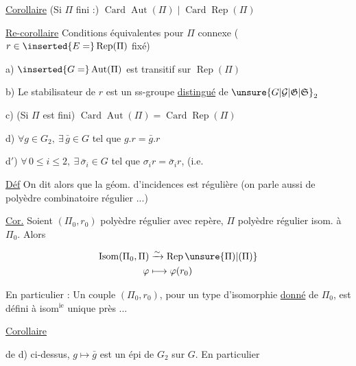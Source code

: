 
\uline{Corollaire} (Si $\Pi$ fini :) $\operatorname{Card}\operatorname{Aut}(\Pi)\mid\operatorname{Card}\operatorname{Rep}(\Pi)$

\uline{Re-corollaire} Conditions équivalentes pour $\Pi$ connexe (  $r\in\inserted{E=}\operatorname{Rep}(\Pi)$ fixé)

a) $\inserted{G=}\operatorname{Aut}(\Pi)$ est transitif sur $\operatorname{Rep}(\Pi)$

b) Le stabilisateur de  $r$ est un ss-groupe \uline{distingué} de $\unsure{G|\mathcal G|\mathfrak G|\mathfrak S}_2$

c) (Si $\Pi$ est fini) $\operatorname{Card}\operatorname{Aut}(\Pi)=\operatorname{Card}\operatorname{Rep}(\Pi)$

d) $\forall g\in G_2,\ \exists\,\bar g\in G$ tel que $g.r=\bar g.r$

d$'$) $\forall\,0\leq i\leq2,\ \exists\,\bar\sigma_i\in G$ tel que $\sigma_i r=\bar\sigma_i r$, (i.e.


\uline{Déf} On dit alors que la géom. d'incidences est régulière (on parle aussi de polyèdre combinatoire régulier ...)

\uline{Cor.} Soient $(\Pi_0,r_0)$ polyèdre régulier avec repère, $\Pi$ polyèdre régulier isom. à $\Pi_0$. Alors

\[
 \begin{aligned}
 \operatorname{Isom}(\Pi_0,\Pi)&\xrightarrow{\sim}\operatorname{Rep}\unsure{\Pi)|(\Pi)}\\
 \varphi&\longmapsto\varphi(r_0)
 \end{aligned}
\]

En particulier : Un couple $(\Pi_0,r_0)$, pour un type d'isomorphie \uline{donné} de $\Pi_0$, est défini à isom$^{\mathrm{ie}}$ unique près ...

\uline{Corollaire}


  de d) ci-dessus, $g\mapsto\bar g$ est un épi de $G_2$ sur $G$. En particulier


